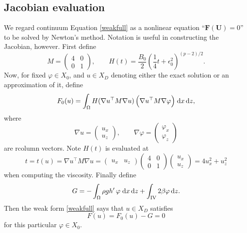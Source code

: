 \documentclass[11pt,final,reqno]{amsart}
\theoremstyle{remark}
\theoremstyle{definition}
\newcommand{\eps}{\epsilon}
\newcommand{\grad}{\nabla}
\newcommand{\bbF}{\mathbf{F}}
\newcommand{\bU}{\mathbf{U}}
\begin{document}
\subsection*{Jacobian evaluation}  We regard continuum Equation \eqref{weakfull} as a nonlinear equation ``$\bbF(\bU)=0$'' to be solved by Newton's method.  Notation is useful in constructing the Jacobian, however.  First define
	$$M = \begin{pmatrix} 4 & 0 \\ 0 & 1 \end{pmatrix}, \qquad H(t) = \frac{B_0}{2} \left(\frac{1}{4} t + \eps_0^2\right)^{(p-2)/2}.$$
Now, for fixed $\varphi\in X_0$, and $u\in X_D$ denoting either the exact solution or an approximation of it, define
	$$F_0(u) = \int_\Omega H(\grad u^\top M \grad u) \,\Big(\grad u^\top M \grad \varphi\Big) \dxdz,$$
where
    $$\grad u = \begin{pmatrix} u_x \\ u_z \end{pmatrix}, \qquad \grad \varphi = \begin{pmatrix} \varphi_x \\ \varphi_z \end{pmatrix}$$
are rcolumn vectors.  Note $H(t)$ is evaluated at
	$$t = t(u) = \grad u^\top M \grad u = \begin{pmatrix} u_x &  u_z \end{pmatrix} \begin{pmatrix} 4 & 0 \\ 0 & 1 \end{pmatrix} \begin{pmatrix} u_x \\ u_z \end{pmatrix} = 4 u_x^2 + u_z^2$$
when computing the viscosity.  Finally define
	$$G = - \int_\Omega \rho g h'\,\varphi \;\mathrm{d}x\,\mathrm{d}z + \int_{\mathrm{IV}} 2 \beta \varphi \,\mathrm{d}z.$$
Then the weak form \eqref{weakfull} says that $u\in X_D$ satisfies
\begin{equation}\label{continuumF}
	F(u) = F_0(u) - G = 0
\end{equation}
for this particular $\varphi\in X_0$.
\end{document}
